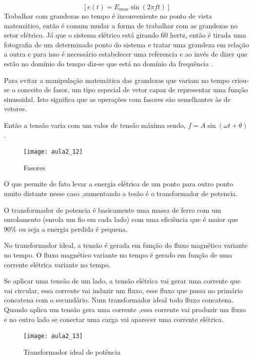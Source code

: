 \begin{equation}\label{eq:omega11}
[e(t)=E_{max}\sin(2\pi ft)]
\end{equation}
Trabalhar com grandezas no tempo é inconveniente no ponto de vista
matemático, então é comum mudar a forma de trabalhar com as grandezas
no setor elétrico. Já que o sistema elétrico está girando 60 hertz,
então é tirada uma fotografia de um determinado ponto do sistema e
tratar uma grandeza em relação a outra e para isso é necessário estabelecer
uma referencia e ao invés de dizer que estão no domínio do tempo diz-se
que está no domínio da frequência . 

Para evitar a manipulação matemática das grandezas que variam no tempo
criou-se o conceito de fasor, um tipo especial de vetor capaz de representar
uma função sinusoidal. Isto significa que as operações com fasores
são semelhantes às de vetores.

Então a tensão varia com um valor de tensão máxima sendo, $f=A\sin(\omega t+\theta)$.
\begin{figure}[H]
\begin{centering}
\texttt{[image: aula2\_12]}\protect\caption{\label{fig:aula2_12}Fasores }
\end{centering}
\end{figure}
O que permite de fato levar a energia elétrica de um ponto para outro
ponto muito distante nesse caso ,aumentando a tesão é o transformador
de potencia.

O transformador de potencia é basicamente uma massa de ferro com um
enrolamento (enrola um fio em cada lado) com uma eficiência que é
maior que 90\% ou seja a energia perdida é pequena.

No transformador ideal, a tensão é gerada em função do fluxo magnético
variante no tempo. O fluxo magnético variante no tempo é gerado em
função de uma corrente elétrica variante no tempo.

Se aplicar uma tensão de um lado, a tensão elétrica vai gerar uma
corrente que vai circular, essa corrente vai induzir um fluxo, esse
fluxo que passa no primário concatena com o secundário. Num transformador
ideal todo fluxo concatena. Quando aplica um tensão gera uma corrente
,essa corrente vai produzir um fluxo e no outro lado se conectar uma
carga vai aparecer uma corrente elétrica.
\begin{figure}[H]
\begin{centering}
\texttt{[image: aula2\_13]}\protect\caption{\label{fig:aula2_13}Transformador ideal de potência}
\end{centering}
\end{figure}

